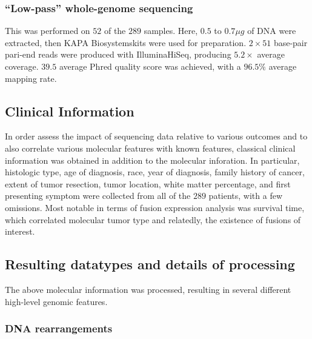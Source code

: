 \subsubsection{``Low-pass'' whole-genome sequencing}

This was performed on $52$ of the $289$ samples. Here, $0.5$ to
$0.7\mu g$ of DNA were extracted, then KAPA Biosystems\reg kits were
used for preparation. $2 \times 51$ base-pair pari-end reads were
produced with Illumina\reg HiSeq\tm, producing $5.2 \times$ average
coverage. $39.5$ average Phred quality score was achieved, with a
$96.5\%$ average mapping rate.

\subsection{Clinical Information}

In order assess the impact of sequencing data relative to various
outcomes and to also correlate various molecular features with known
features, classical clinical information was obtained in addition to
the molecular inforation. In particular, histologic type, age of
diagnosis, race, year of diagnosis, family history of cancer, extent
of tumor resection, tumor location, white matter percentage, and first
presenting symptom were collected from all of the $289$ patients, with
a few omissions. Most notable in terms of fusion expression analysis
was survival time, which correlated molecular tumor type and
relatedly, the existence of fusions of interest.

\subsection{Resulting datatypes and details of processing}

The above molecular information was processed, resulting in several
different high-level genomic features.

\subsubsection{DNA rearrangements}

